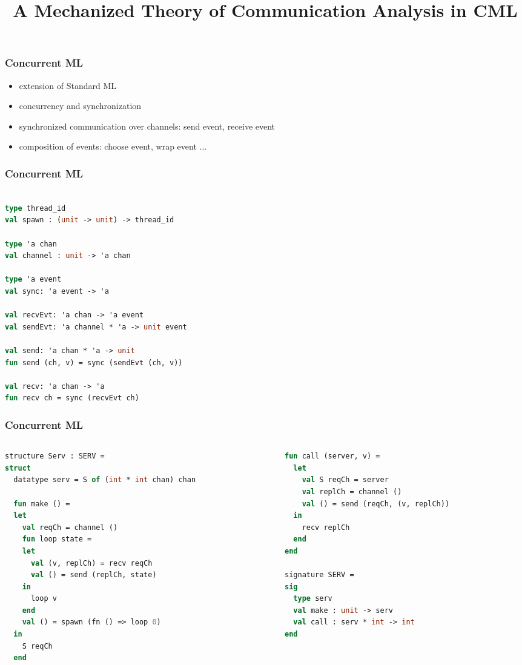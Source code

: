 \documentclass{beamer}
\title{A Mechanized Theory of Communication Analysis in CML}
\begin{document}
\begin{frame}
  \titlepage
\end{frame}

\begin{frame}
\frametitle{Concurrent ML}
\begin{itemize}
\item extension of Standard ML
\item concurrency and synchronization
\item synchronized communication over channels: send event, receive event
\item composition of events: choose event, wrap event ...
\end{itemize}
\end{frame}

\begin{frame}[fragile]
\frametitle{Concurrent ML}
\begin{lstlisting}[language=ML]

type thread_id
val spawn : (unit -> unit) -> thread_id

type 'a chan
val channel : unit -> 'a chan

type 'a event
val sync: 'a event -> 'a

val recvEvt: 'a chan -> 'a event
val sendEvt: 'a channel * 'a -> unit event

val send: 'a chan * 'a -> unit
fun send (ch, v) = sync (sendEvt (ch, v))

val recv: 'a chan -> 'a
fun recv ch = sync (recvEvt ch)

\end{lstlisting}
\end{frame}


\begin{frame}[fragile]
	\frametitle{Concurrent ML}
\begin{columns}
\begin{column}{0.5\textwidth}
\begin{lstlisting}[language=ML, mathescape]
structure Serv : SERV =
struct 
  datatype serv = S of (int * int chan) chan

  fun make () =
  let 
    val reqCh = channel ()
    fun loop state =
    let
      val (v, replCh) = recv reqCh
      val () = send (replCh, state)
    in
      loop v
    end
    val () = spawn (fn () => loop 0)
  in
    S reqCh
  end 
\end{lstlisting}
\end{column}


\begin{column}{0.5\textwidth}
\begin{lstlisting}[language=ML, mathescape]
  fun call (server, v) =
  let 
    val S reqCh = server
    val replCh = channel () 
    val () = send (reqCh, (v, replCh))
  in
    recv replCh
  end
end

signature SERV =
sig 
  type serv
  val make : unit -> serv
  val call : serv * int -> int
end
\end{lstlisting}
\end{column}

\end{columns}


\end{frame}
\end{document}
